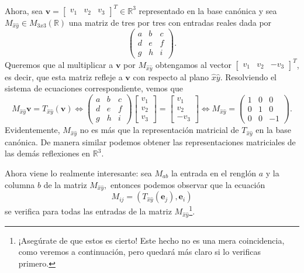 \documentclass[12pt]{article}
\begin{document}
Ahora, sea $\mathbf{v}=\begin{bmatrix}v_1&v_2&v_3\end{bmatrix}^T\in\mathbb{R}^3$ representado en la base canónica y sea $M_{\hat{x}\hat{y}}\in M_{3x3}(\mathbb{R})$ una matriz de tres por tres con entradas reales dada por \[\begin{pmatrix}a&b&c\\d&e&f\\g&h&i\end{pmatrix}.\] Queremos que al multiplicar a $\mathbf{v}$ por $M_{\hat{x}\hat{y}}$ obtengamos al vector $\begin{bmatrix}v_1&v_2&-v_3\end{bmatrix}^T$, es decir, que esta matriz refleje a $\mathbf{v}$ con respecto al plano $\hat{x}\hat{y}$. Resolviendo el sistema de ecuaciones correspondiente, vemos que \[M_{\hat{x}\hat{y}}\mathbf{v}=T_{\hat{x}\hat{y}}(\mathbf{v})\iff \begin{pmatrix}a&b&c\\d&e&f\\g&h&i\end{pmatrix}\begin{bmatrix}v_1\\v_2\\v_3\end{bmatrix}=\begin{bmatrix}v_1\\v_2\\-v_3\end{bmatrix}\iff M_{\hat{x}\hat{y}}=\begin{pmatrix}1&0&0\\0&1&0\\0&0&-1\end{pmatrix}.\] Evidentemente, $M_{\hat{x}\hat{y}}$ no es más que la representación matricial de $T_{\hat{x}\hat{y}}$ en la base canónica. De manera similar podemos obtener las representaciones matriciales de las demás reflexiones en $\mathbb{R}^3$.

Ahora viene lo realmente interesante: sea $M_{ab}$ la entrada en el renglón $a$ y la columna $b$ de la matriz $M_{\hat{x}\hat{y}},$ entonces podemos observar que la ecuación \[M_{ij}=(T_{\hat{x}\hat{y}}(\mathbf{e}_j),\mathbf{e}_i) \] se verifica para todas las entradas de la matriz $M_{\hat{x}\hat{y}}$\footnote{¡Asegúrate de que estos es cierto! Este hecho no es una mera coincidencia, como veremos a continuación, pero quedará más claro si lo verificas primero.}.
\vspace{3mm}
\end{document}
